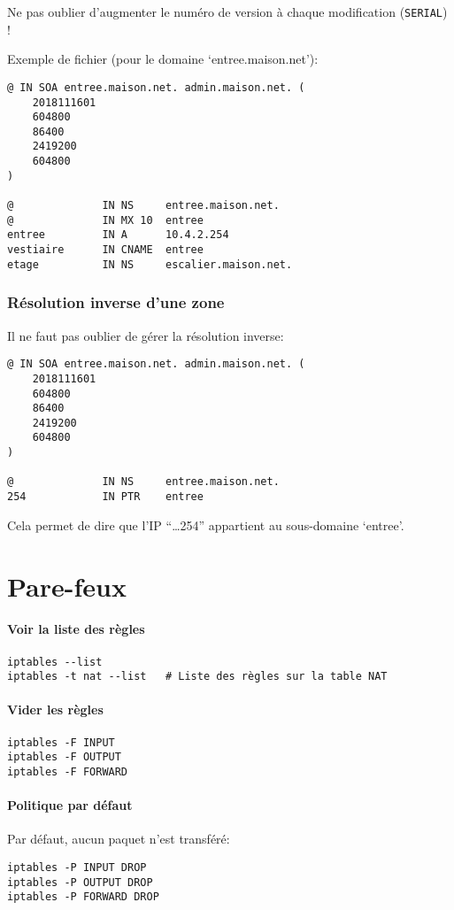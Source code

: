 \documentclass[10pt,a4paper,french]{article}
\begin{document}
Ne pas oublier d'augmenter le numéro de version à chaque modification ({\tt SERIAL}) !

Exemple de fichier (pour le domaine `entree.maison.net'):
\begin{verbatim}
@ IN SOA entree.maison.net. admin.maison.net. (
    2018111601
    604800
    86400
    2419200
    604800
)

@              IN NS     entree.maison.net.
@              IN MX 10  entree
entree         IN A      10.4.2.254
vestiaire      IN CNAME  entree
etage          IN NS     escalier.maison.net.
\end{verbatim}

\subsubsection{Résolution inverse d'une zone}

Il ne faut pas oublier de gérer la résolution inverse:
\begin{verbatim}
@ IN SOA entree.maison.net. admin.maison.net. (
    2018111601
    604800
    86400
    2419200
    604800
)

@              IN NS     entree.maison.net.
254            IN PTR    entree
\end{verbatim}
Cela permet de dire que l'IP ``\ldots 254'' appartient au sous-domaine `entree'.

\section{Pare-feux}

\paragraph{Voir la liste des règles}
\begin{verbatim}
iptables --list
iptables -t nat --list   # Liste des règles sur la table NAT
\end{verbatim}

\paragraph{Vider les règles}
\begin{verbatim}
iptables -F INPUT
iptables -F OUTPUT
iptables -F FORWARD
\end{verbatim}

\paragraph{Politique par défaut}
Par défaut, aucun paquet n'est transféré:
\begin{verbatim}
iptables -P INPUT DROP
iptables -P OUTPUT DROP
iptables -P FORWARD DROP
\end{verbatim}
\end{document}
